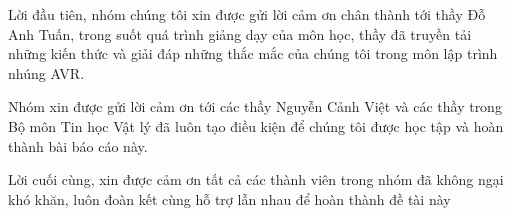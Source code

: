
\begin{acknowledgements}
	\addchaptertocentry{\acknowledgementname}
	\thispagestyle{empty}
	
	Lời đầu tiên, nhóm chúng tôi xin được gửi lời cảm ơn chân thành tới thầy Đỗ Anh Tuấn, trong suốt quá trình giảng dạy của môn học, thầy đã truyền tải những kiến thức và giải đáp những thắc mắc của chúng tôi trong môn lập trình nhúng AVR.
	
	Nhóm xin được gửi lời cảm ơn tới các thầy Nguyễn Cảnh Việt và các thầy trong Bộ môn Tin học Vật lý đã luôn tạo điều kiện để chúng tôi được học tập và hoàn thành bài báo cáo này.
	
	Lời cuối cùng, xin được cảm ơn tất cả các thành viên trong nhóm đã không ngại khó khăn, luôn đoàn kết cùng hỗ trợ lẫn nhau để hoàn thành đề tài này
\end{acknowledgements}